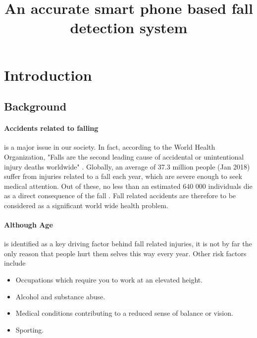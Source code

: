 \documentclass[12pt, a4paper, onecolumn]{article}
\begin{document}
	
	\title{An accurate smart phone based fall detection system}
	\maketitle
	
	\tableofcontents
	\newpage
	
	\section{Introduction}
	
	\subsection{Background}
	
	\paragraph{Accidents related to falling} is a major issue in our society. In fact, according to the World Health Organization, "Falls are the second leading cause of accidental or unintentional injury deaths worldwide" \cite{who}. Globally, an average of 37.3 million people (Jan 2018) suffer from injuries related to a fall each year, which are severe enough to seek medical attention. Out of these, no less than an estimated 640 000 individuals die as a direct consequence of the fall \cite{who}. Fall  related accidents are therefore to be considered as a significant world wide health problem. 
	
	\paragraph{Although Age} is identified as a key driving factor behind fall related injuries, it is not by far the only reason that people hurt them selves this way every year.  Other risk factors include 
	\begin{itemize}
		\item Occupations which require you to work at an elevated height.
		\item Alcohol and substance abuse.
		\item Medical conditions contributing to a reduced sense of balance or vision.
		\item Sporting.	
	\end{itemize}
	
\end{document}
